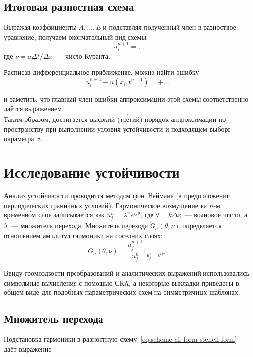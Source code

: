 \documentclass[14pt]{report}
\begin{document}
\section{Итоговая разностная схема}
Выражая коэффициенты $A,\dots,E$ и подставляя полученный член в разностное уравнение, получаем окончательный вид схемы
\begin{dmath}
u_i^{n+1} =
,
\label{eq:scheme-cfl-form-stencil-form}
\end{dmath}
где $\nu = a\Delta t/\Delta x$~--- число Куранта.  

Расписав дифференциальное приближение, можно найти ошибку
\begin{dmath*}
u_i^{n + 1} - u(x_i, t^{n + 1}) =  + \ldots
\end{dmath*}

и заметить, что главный член ошибки аппроксимации этой схемы соответственно даётся выражением
\begin{equation}
.
\label{eq:principal-error-term}
\end{equation}
Таким образом, достигается высокий (третий) порядок аппроксимации по пространству при выполнении условия устойчивости и подходящем выборе параметра $\sigma$.

\chapter{Исследование устойчивости}
\label{sec:stability-analysis}

Анализ устойчивости проводится методом фон~\mbox{Неймана} (в предположении периодических граничных условий). Гармоническое возмущение на $n$-м временн\'{о}м слое записывается как $u_j^n = \lambda^n e^{i j\theta}$, где $\theta = k\Delta x$~--- волновое число, а $\lambda$~--- множитель перехода. Множитель перехода $G_{\sigma}(\theta,\nu)$ определяется отношением амплитуд гармоники на соседних слоях:
\begin{equation*}
G_{\sigma}(\theta, \nu) = \frac{u_j^{n+1}}{u_j^n}\Big|_{\,u_j^n = e^{i j\theta}}.
\end{equation*}

Ввиду громоздкости преобразований и аналитических выражений использовались символьные вычисления с помощью СКА, а некоторые выкладки приведены в общем виде для подобных параметрических схем на симметричных шаблонах.

\section{Множитель перехода}
Подстановка гармоники в разностную схему~\eqref{eq:scheme-cfl-form-stencil-form} даёт выражение
\end{document}
